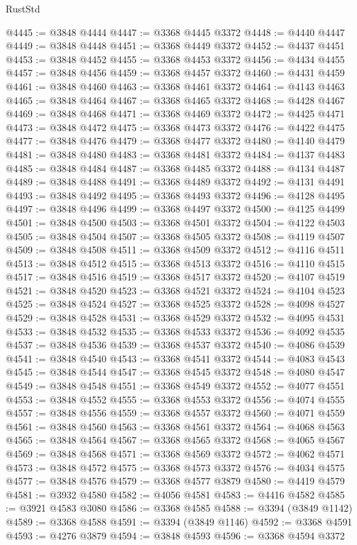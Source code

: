 \begin{lexlean}{RustStd}
\begin{coremodule}
@4445 := @3848 @4444
@4447 := @3368 @4445 @3372
@4448 := @4440 @4447
@4449 := @3848 @4448
@4451 := @3368 @4449 @3372
@4452 := @4437 @4451
@4453 := @3848 @4452
@4455 := @3368 @4453 @3372
@4456 := @4434 @4455
@4457 := @3848 @4456
@4459 := @3368 @4457 @3372
@4460 := @4431 @4459
@4461 := @3848 @4460
@4463 := @3368 @4461 @3372
@4464 := @4143 @4463
@4465 := @3848 @4464
@4467 := @3368 @4465 @3372
@4468 := @4428 @4467
@4469 := @3848 @4468
@4471 := @3368 @4469 @3372
@4472 := @4425 @4471
@4473 := @3848 @4472
@4475 := @3368 @4473 @3372
@4476 := @4422 @4475
@4477 := @3848 @4476
@4479 := @3368 @4477 @3372
@4480 := @4140 @4479
@4481 := @3848 @4480
@4483 := @3368 @4481 @3372
@4484 := @4137 @4483
@4485 := @3848 @4484
@4487 := @3368 @4485 @3372
@4488 := @4134 @4487
@4489 := @3848 @4488
@4491 := @3368 @4489 @3372
@4492 := @4131 @4491
@4493 := @3848 @4492
@4495 := @3368 @4493 @3372
@4496 := @4128 @4495
@4497 := @3848 @4496
@4499 := @3368 @4497 @3372
@4500 := @4125 @4499
@4501 := @3848 @4500
@4503 := @3368 @4501 @3372
@4504 := @4122 @4503
@4505 := @3848 @4504
@4507 := @3368 @4505 @3372
@4508 := @4119 @4507
@4509 := @3848 @4508
@4511 := @3368 @4509 @3372
@4512 := @4116 @4511
@4513 := @3848 @4512
@4515 := @3368 @4513 @3372
@4516 := @4110 @4515
@4517 := @3848 @4516
@4519 := @3368 @4517 @3372
@4520 := @4107 @4519
@4521 := @3848 @4520
@4523 := @3368 @4521 @3372
@4524 := @4104 @4523
@4525 := @3848 @4524
@4527 := @3368 @4525 @3372
@4528 := @4098 @4527
@4529 := @3848 @4528
@4531 := @3368 @4529 @3372
@4532 := @4095 @4531
@4533 := @3848 @4532
@4535 := @3368 @4533 @3372
@4536 := @4092 @4535
@4537 := @3848 @4536
@4539 := @3368 @4537 @3372
@4540 := @4086 @4539
@4541 := @3848 @4540
@4543 := @3368 @4541 @3372
@4544 := @4083 @4543
@4545 := @3848 @4544
@4547 := @3368 @4545 @3372
@4548 := @4080 @4547
@4549 := @3848 @4548
@4551 := @3368 @4549 @3372
@4552 := @4077 @4551
@4553 := @3848 @4552
@4555 := @3368 @4553 @3372
@4556 := @4074 @4555
@4557 := @3848 @4556
@4559 := @3368 @4557 @3372
@4560 := @4071 @4559
@4561 := @3848 @4560
@4563 := @3368 @4561 @3372
@4564 := @4068 @4563
@4565 := @3848 @4564
@4567 := @3368 @4565 @3372
@4568 := @4065 @4567
@4569 := @3848 @4568
@4571 := @3368 @4569 @3372
@4572 := @4062 @4571
@4573 := @3848 @4572
@4575 := @3368 @4573 @3372
@4576 := @4034 @4575
@4577 := @3848 @4576
@4579 := @3368 @4577 @3879
@4580 := @4419 @4579
@4581 := @3932 @4580
@4582 := @4056 @4581
@4583 := @4416 @4582
@4585 := @3921 @4583 @3080
@4586 := @3368 @4585
@4588 := @3394 (@3849 @1142)
@4589 := @3368 @4588
@4591 := @3394 (@3849 @1146)
@4592 := @3368 @4591
@4593 := @4276 @3879
@4594 := @3848 @4593
@4596 := @3368 @4594 @3372

\end{coremodule}
\end{lexlean}
